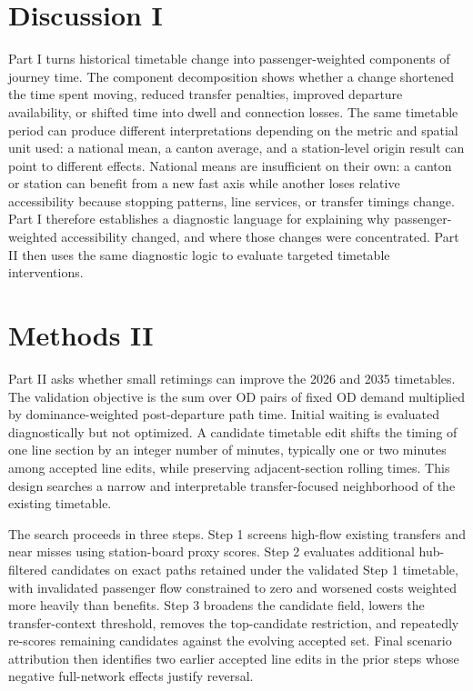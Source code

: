 \documentclass[conference]{IEEEtran}
\begin{document}
\section{Discussion I}
Part I turns historical timetable change into passenger-weighted components of journey time. The component decomposition shows whether a change shortened the time spent moving, reduced transfer penalties, improved departure availability, or shifted time into dwell and connection losses. The same timetable period can produce different interpretations depending on the metric and spatial unit used: a national mean, a canton average, and a station-level origin result can point to different effects. National means are insufficient on their own: a canton or station can benefit from a new fast axis while another loses relative accessibility because stopping patterns, line services, or transfer timings change. Part I therefore establishes a diagnostic language for explaining why passenger-weighted accessibility changed, and where those changes were concentrated. Part II then uses the same diagnostic logic to evaluate targeted timetable interventions.

\section{Methods II}
Part II asks whether small retimings can improve the 2026 and 2035 timetables. The validation objective is the sum over OD pairs of fixed OD demand multiplied by dominance-weighted post-departure path time. Initial waiting is evaluated diagnostically but not optimized. A candidate timetable edit shifts the timing of one line section by an integer number of minutes, typically one or two minutes among accepted line edits, while preserving adjacent-section rolling times. This design searches a narrow and interpretable transfer-focused neighborhood of the existing timetable.

The search proceeds in three steps. Step 1 screens high-flow existing transfers and near misses using station-board proxy scores. Step 2 evaluates additional hub-filtered candidates on exact paths retained under the validated Step 1 timetable, with invalidated passenger flow constrained to zero and worsened costs weighted more heavily than benefits. Step 3 broadens the candidate field, lowers the transfer-context threshold, removes the top-candidate restriction, and repeatedly re-scores remaining candidates against the evolving accepted set. Final scenario attribution then identifies two earlier accepted line edits in the prior steps whose negative full-network effects justify reversal.
\end{document}
